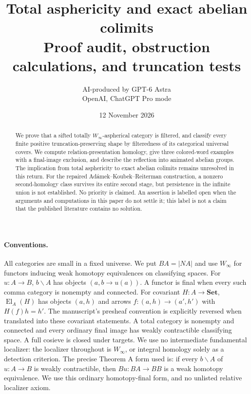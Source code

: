 \documentclass[11pt,a4paper]{article}
\title{Total asphericity and exact abelian colimits\\\large Proof audit, obstruction calculations, and truncation tests}
\author{AI-produced by GPT-6 Astra\\OpenAI, ChatGPT Pro mode}
\date{12 November 2026}
\newcommand{\Set}{\mathbf{Set}}
\newcommand{\Winfty}{W_\infty}
\newcommand{\El}{\operatorname{El}}
\theoremstyle{definition}
\begin{document}
\maketitle
\begin{abstract}
We prove that a sifted totally $W_\infty$-aspherical category is filtered, and classify every finite positive truncation-preserving shape by filteredness of its categorical universal covers. We compute relation-presentation homology, give three colored-word examples with a final-image exclusion, and describe the reflection into animated abelian groups. The implication from total asphericity to exact abelian colimits remains unresolved in this return. For the repaired Ad\'amek--Koubek--Reiterman construction, a nonzero second-homology class survives its entire second stage, but persistence in the infinite union is not established. No priority is claimed. An assertion is labelled open when the arguments and computations in this paper do not settle it; this label is not a claim that the published literature contains no solution.
\end{abstract}
\paragraph{Conventions.}
All categories are small in a fixed universe. We put $BA=|NA|$ and use $\Winfty$ for functors inducing weak homotopy equivalences on classifying spaces. For $u:A\to B$, $b\backslash A$ has objects $(a,b\to u(a))$. A functor is final when every such comma category is nonempty and connected. For covariant $H:A\to\Set$, $\El_A(H)$ has objects $(a,h)$ and arrows $f:(a,h)\to(a',h')$ with $H(f)h=h'$. The manuscript's presheaf convention is explicitly reversed when translated into these covariant statements. A total category is nonempty and connected and every ordinary final image has weakly contractible classifying space. A full cosieve is closed under targets. We use no intermediate fundamental localizer: the localizer throughout is $\Winfty$, or integral homology solely as a detection criterion. The precise Theorem A form used is: if every $b\backslash A$ of $u:A\to B$ is weakly contractible, then $Bu:BA\to BB$ is a weak homotopy equivalence. We use this ordinary homotopy-final form, and no unlisted relative localizer axiom.
\tableofcontents
\end{document}
